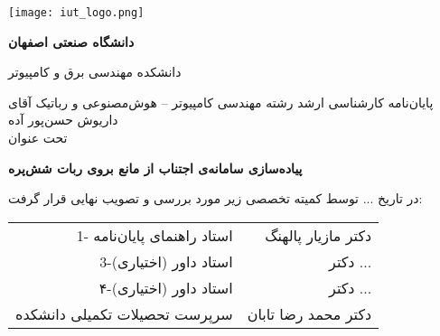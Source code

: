 \thispagestyle{empty}
\begin{center}
\texttt{[image: iut\_logo.png]}
\vspace{0.4cm}

\textbf{دانشگاه صنعتی اصفهان}\\
\vspace{0.4cm}

{\large
	دانشکده مهندسی برق و کامپیوتر
}
\vspace{1.8cm}

\vfill

{\Large
	پایان‌نامه کارشناسی ارشد رشته مهندسی کامپیوتر -- هوش‌مصنوعی و رباتیک آقای داریوش حسن‌پور آده\\
	\vspace{.3cm}
	تحت عنوان\\
}


\end{center}
\vfill
\vspace{2.5cm}

{\large
	\textbf{پیاده‌سازی سامانه‌ی اجتناب از مانع بروی ربات شش‌پره}
}

\vspace*{2cm}

در تاریخ ... توسط کمیته تخصصی زیر مورد بررسی و تصویب نهایی قرار گرفت:\\
\vspace{0.8cm}

{\normalsize
	
	\begin{tabular}{rr}
	\vspace*{.8cm}
	1- استاد راهنمای پایان‌نامه  & \hspace{2cm} دکتر مازیار پالهنگ \\
	\vspace{.8cm}
	3-استاد داور (اختیاری) &\hspace{2cm} دکتر ... \\
	\vspace{.8cm}
	۴-استاد داور (اختیاری) &\hspace{2cm} دکتر ... \\
	\vspace{.8cm}
	سرپرست تحصیلات تکمیلی دانشکده &\hspace{2cm} دکتر محمد رضا تابان \\
	\end{tabular}
}
\restoregeometry
\pagebreak

\thispagestyle{empty}
\vspace*{1.5cm}

